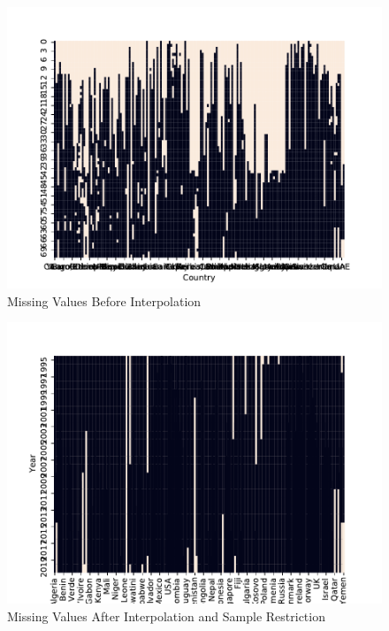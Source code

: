 \documentclass{report}
\begin{document}
	\begin{figure}[h!]
		\centering
		\caption{Missing Values Before Interpolation}
		\label{SIPRI_Missing_Values}	
		\includegraphics[width=\linewidth,keepaspectratio=true]{../Output/Figures/SIPRI_Missing_Values.pdf}
	\end{figure}

	\begin{figure}[h!]
		\centering
		\caption{Missing Values After Interpolation and Sample Restriction}
		\label{SIPRI_Missing_Values_Inter_Post_1995}	
		\includegraphics[width=\linewidth,keepaspectratio=true]{../Output/Figures/SIPRI_Missing_Values_Interpolate_Post_1995.pdf}
	\end{figure}
\end{document}
